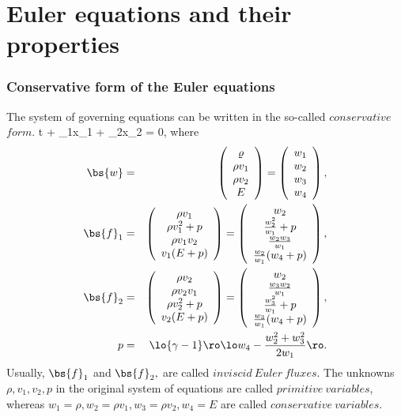 \section{Euler equations and their properties}
\label{sec:euler_properties}
\subsubsection{Conservative form of the Euler equations}
\label{conserv_euler}
The system of governing equations can be written in the so-called $conservative$ $form$.
\be
\label{conservative_form}
{\partial{}\over \partial t} + {_1\over \partial x_1} + {_2\over \partial x_2} = 0,
\ee
where
\begin{eqnarray}
{\bs{w}} & = & \left( \begin{array}{c} \varrho\\ \rho v_1\\ \rho v_2\\ E \end{array} \right) = \left( \begin{array}{c} w_1 \\ w_2 \\ w_3 \\ w_4 \\ \end{array} \right), \\
\label{f_1}
{\bs{f}}_1 & = & \left( \begin{array}{c} \rho v_1\\ \rho v_1^2 + p\\ \rho v_1 v_2\\ v_1(E+p) \end{array} \right) = \left( \begin{array}{c} w_2\\ \frac{w_2^2}{w_1} + p\\ \frac{w_2w_3}{w_1}\\ \frac{w_2}{w_1}(w_4+p) \end{array} \right), \\
\label{f_2}
{\bs{f}}_2 & = & \left( \begin{array}{c} \rho v_2\\ \rho v_2 v_1\\ \rho v_2^2 + p\\ v_2(E+p) \end{array} \right) = \left( \begin{array}{c} w_2\\ \frac{w_3w_2}{w_1}\\ \frac{w_3^2}{w_1} + p\\ \frac{w_3}{w_1}(w_4+p) \end{array} \right), \\
p & = & \lo{\gamma - 1}\ro \lo w_4 - \frac{w_2^2 + w_3^2}{2w_1}\ro.
\end{eqnarray}
Usually, ${\bs{f}}_1$ and ${\bs{f}}_2,$ are called $inviscid\ Euler\ fluxes$. The unknowns $\rho, v_1, v_2, p$ in the original system of equations are called $primitive\ variables$, whereas $w_1 = \rho, w_2 = \rho v_1, w_3 = \rho v_2, w_4 = E$ are called $conservative\ variables$.
